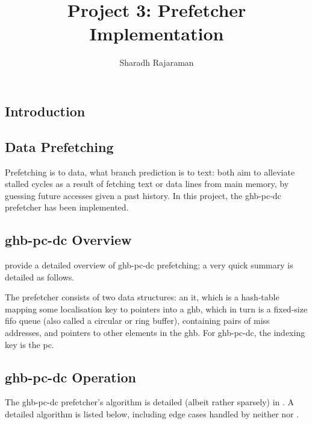 \documentclass[multicol,date,tikzlibs,minted,ieeebib,bibtex]{epreport}
\title{Project 3: Prefetcher Implementation}
\author{Sharadh Rajaraman}
\begin{document}
\maketitle

\begin{multicols}{2}
	\section{Introduction}
	\subsection{Data Prefetching}
	Prefetching is to data, what branch prediction is to text: both aim to alleviate stalled cycles as a result of fetching text or data lines from main memory, by guessing future accesses given a past history.
	In this project, the \gls{ghb-pc-dc} prefetcher has been implemented.
	\subsection{\texorpdfstring{\gls{ghb-pc-dc} Overview}{GHB PC/DC Overview}}
	\citeauthor{nesbitDataCachePrefetching2004} provide a detailed overview of \gls{ghb-pc-dc} prefetching\cite{nesbitDataCachePrefetching2004}; a very quick summary is detailed as follows.

	The prefetcher consists of two data structures: an \gls{it}, which is a hash-table mapping some localisation key to pointers into a \gls{ghb}, which in turn is a fixed-size \gls{fifo} queue (also called a circular or ring buffer), containing pairs of miss addresses, and pointers to other elements in the \gls{ghb}.
	For \gls{ghb-pc-dc}, the indexing key is the \gls{pc}.

	\subsection{\texorpdfstring{\gls{ghb-pc-dc} Operation}{GHB PC/DC Operation}}\label{subsec:ghb-pc-dc-oper}
	The \gls{ghb-pc-dc} prefetcher's algorithm is detailed (albeit rather sparsely) in \cite{falsafiPrimerHardwarePrefetching2014}.
	A detailed algorithm is listed below, including edge cases handled by neither \citeauthor{nesbitDataCachePrefetching2004} nor \citeauthor{falsafiPrimerHardwarePrefetching2014}.


\end{multicols}
\end{document}
